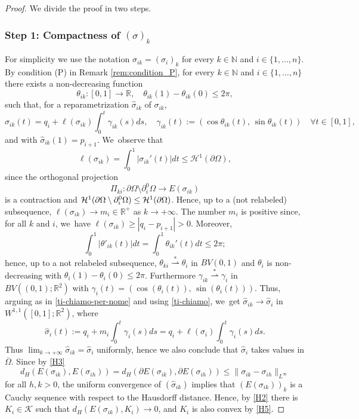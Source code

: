 \documentclass[11pt]{article}
\numberwithin{equation}{section}
\newcommand{\R}{\mathbb{R}}
\let\len\ell
\let\Om\Omega
\newcommand{\weakstar}{\stackrel{*}{\rightharpoonup}}
\theoremstyle{definition}
\begin{document}
\begin{proof}We divide the proof in two steps.\vspace*{-.5\baselineskip}

\subsubsection*{Step 1: Compactness of $(\sigma)_k$}
For simplicity we use the notation $\sigma_{ik} = (\sigma_i)_k$ for every $k\in
\mathbb N$ and $i\in\{1,\dots,n\}$.
By condition (P) in Remark \ref{rem:condition_P}, for every $k \in \mathbb N$ and $i\in\{1,\dots,n\}$
there exists a non-decreasing
function
\[
\theta_{ik}\colon[0,1]\to\R,\quad \theta_{ik}(1)-\theta_{ik}(0)\le2\pi,
\]
such that, for a reparametrization $\widehat \sigma_{ik}$ of $\sigma_{ik}$,
\begin{equation*}
\widehat\sigma_{ik}(t)=q_i+ \len(\sigma_{ik})\int_0^t\gamma_{ik}(s)ds,\quad \gamma_{ik}(t):=(\cos\theta_{ik}(t),\,\sin\theta_{ik}(t))
\quad\forall t\in[0,1],
\end{equation*}
and with $\widehat\sigma_{ik}(1)=p_{i+1}$. We~observe that
\begin{equation}\label{ti-chiamo}
\len(\sigma_{ik})=\int_0^1|\sigma_{ik}'(t)|dt\le\mathcal{H}^1(\partial\Om),
\end{equation}
since the orthogonal projection
\[
\Pi_{ki}\colon\partial\Om\setminus\partial^0_i\Om\to E(\sigma_{ik})
\]
is a contraction and $\mathcal{H}^1(\partial\Om\setminus\nobreak\partial^0_i\Om)\le \mathcal{H}^1(\partial\Om)$.
Hence, up to a (not relabeled) subsequence,
$\len(\sigma_{ik})\to m_i\in \R^+$ as $k \to +\infty$. The number $m_i$ is positive since, for all $k$ and $i$, we~have
$\len(\sigma_{ik})\geq |q_i-p_{i+1}|>0$.
Moreover,
\begin{equation*}
\int_0^1|\theta'_{ik}(t)|dt=\int_0^1\theta_{ik}'(t)dt\le2\pi;
\end{equation*}
hence, up to a not relabeled subsequence, $\theta_{ki}\weakstar\theta_i$ in $BV(0,1)$ and $\theta_i$ is non-decreasing with $\theta_i(1)-\theta_i(0)\le2\pi$. Furthermore $\gamma_{ik}\stackrel{*}{\rightharpoonup}\gamma_i$ in $BV((0,1);\R^2)$ with $\gamma_i(t)=(\cos(\theta_i(t)),\,\sin(\theta_i(t)))$. Thus, arguing as in \eqref{ti-chiamo-per-nome} and using \eqref{ti-chiamo}, we~get $\widehat\sigma_{ik}\to\widehat\sigma_i$ in $W^{1,1}([0,1];\R^2)$, where
\begin{equation}\label{sigmai}
\widehat\sigma_i(t):=q_i+m_i\int_0^t\gamma_i(s)ds=q_i+\len(\sigma_i)\int_0^t\gamma_i(s)ds.
\end{equation}
Thus $\lim_{k \to +\infty}\widehat\sigma_{ik}=\widehat\sigma_i$ uniformly, hence we also conclude that $\widehat\sigma_i$ takes values in $\overline\Om$.
Since by \ref{H3}
\[
d_H(E(\sigma_{ik}),E(\sigma_{ih}))=d_H(\partial E(\sigma_{ik}),\partial E(\sigma_{ih}))\leq \|\sigma_{ik}-\sigma_{ih}\|_{L^\infty}
\]
for all $h,k>0$,
the uniform convergence of $(\widehat\sigma_{ik})$ implies that $(E(\sigma_{ik}))_k$ is a Cauchy sequence with respect to the Hausdorff distance. Hence, by \ref{H2} there is $K_i\in\mathcal K$ such that $ d_H(E(\sigma_{ik}),K_i)\to0$, and $K_i$ is also convex by \ref{H5}.


\end{proof}
\end{document}
